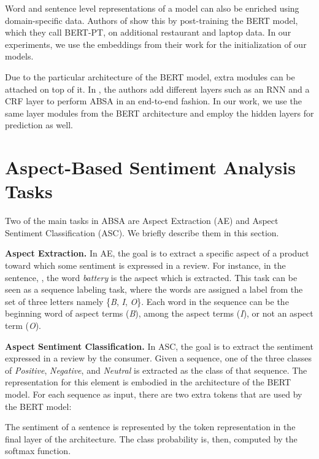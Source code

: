 \documentclass{article}
\begin{document}
Word and sentence level representations of a model can also be enriched using domain-specific data. Authors of \cite{xu2019bert} show this by post-training the BERT model, which they call BERT-PT, on additional restaurant and laptop data. In our experiments, we use the embeddings from their work for the initialization of our models. 

Due to the particular architecture of the BERT model, extra modules can be attached on top of it. In \cite{li2019exploiting}, the authors add different layers such as an RNN and a CRF layer to perform ABSA in an end-to-end fashion. In our work, we use the same layer modules from the BERT architecture and employ the hidden layers for prediction as well. 

\section{Aspect-Based Sentiment Analysis Tasks}

Two of the main tasks in ABSA are Aspect Extraction (AE) and Aspect Sentiment Classification (ASC). We briefly describe them in this section. 

\textbf{Aspect Extraction.}
In AE, the goal is to extract a specific aspect of a product toward which some sentiment is expressed in a review. For instance, in the sentence, , the word \textit{battery} is the aspect which is extracted. This task can be seen as a sequence labeling task, where the words are assigned a label from the set of three letters namely \{\textit{B}, \textit{I}, \textit{O}\}.  Each word in the sequence can be the beginning word of aspect terms (\textit{B}), among the aspect terms (\textit{I}), or not an aspect term (\textit{O}). 

\textbf{Aspect Sentiment Classification.}
In ASC, the goal is to extract the sentiment expressed in a review by the consumer. Given a sequence, one of the three classes of \textit{Positive}, \textit{Negative}, and \textit{Neutral} is extracted as the class of that sequence. The representation for this element is embodied in the architecture of the BERT model. For each sequence as input, there are two extra tokens that are used by the BERT model:
\begin{center}
	
\end{center}
The sentiment of a sentence is represented by the  token representation in the final layer of the architecture. The class probability is, then, computed by the softmax function. 
\end{document}
